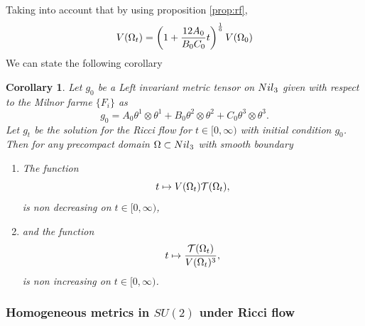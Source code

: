 \documentclass{amsart}
\newtheorem{corollary}[theorem]{Corollary}
\theoremstyle{definition}
\theoremstyle{remark}
\newcommand{\V}{{\rm V}}
\begin{document}
Taking into account that by using proposition \ref{prop:rf},
$$
\V(\Omega_t)=\left(1+\frac{12A_0}{B_0C_0}t\right)^\frac{1}{6}\V(\Omega_0)
$$
We can state the following corollary
\begin{corollary}
    Let $g_0$ be a Left invariant metric tensor on ${\rm Nil}_3$ given with respect to the Milnor farme $\{F_i\}$ as
$$
g_0=A_0\theta^1\otimes\theta^1+B_0\theta^2\otimes\theta^2+C_0\theta^3\otimes\theta^3.
$$
Let $g_t$ be the solution for the Ricci flow for $t\in [0,\infty)$ with initial condition $g_0$. Then for any precompact domain $\Omega\subset {\rm Nil}_3$ with smooth boundary
\begin{enumerate}
    \item The function 
    $$
t\mapsto \V(\Omega_t)\mathcal{T}(\Omega_t),
    $$
    is non decreasing on $t\in [0,\infty)$,
    \item  and the function
    $$
t\mapsto \frac{\mathcal{T}(\Omega_t)}{\V(\Omega_t)^3},
    $$
    is non increasing on $t\in [0,\infty)$.
\end{enumerate}
\end{corollary}

\subsubsection{Homogeneous metrics in $SU(2)$  under Ricci flow}\label{sec:su2}
\end{document}
